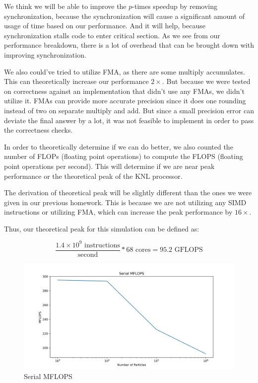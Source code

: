 \documentclass{article}
\begin{document}
We think we will be able to improve the $p$-times speedup by removing synchronization, because the synchronization will cause a significant amount of usage of time based on our performance. And it will help, because synchronization stalls code to enter critical section. As we see from our performance breakdown, there is a lot of overhead that can be brought down with improving synchronization.

We also could've tried to utilize FMA, as there are some multiply accumulates. This can theoretically increase our performance $2\times$. But because we were tested on correctness against an implementation that didn't use any FMAs, we didn't utilize it. FMAs can provide more accurate precision since it does one rounding instead of two on separate multiply and add. But since a small precision error can deviate the final answer by a lot, it was not feasible to implement in order to pass the correctness checks.

In order to theoretically determine if we can do better, we also counted the number of FLOPs (floating point operations) to compute the FLOPS (floating point operations per second). This will determine if we are near peak performance or the theoretical peak of the KNL processor. 

The derivation of theoretical peak will be slightly different than the ones we were given in our previous homework. This is because we are not utilizing any SIMD instructions or utilizing FMA, which can increase the peak performance by $16\times$. 

Thus, our theoretical peak for this simulation can be defined as:

$$\frac{1.4 \times 10^9 \textrm{ instructions}}{\textrm{second}} * 68 \textrm{ cores} = 95.2 \textrm{ GFLOPS}$$

\begin{figure}[H]
\centering
\includegraphics[width=6in]{figures/serial_flops.png}
\caption{Serial MFLOPS}
\label{fig:serial-flops}
\end{figure}
\end{document}
